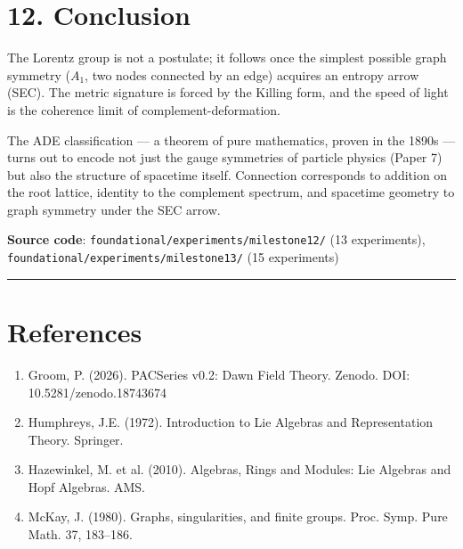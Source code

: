\documentclass[11pt,a4paper]{article}
\providecommand{\tightlist}{\setlength{\itemsep}{0pt}\setlength{\parskip}{0pt}}
\begin{document}
\section*{12. Conclusion}

The Lorentz group is not a postulate; it follows once the simplest possible graph symmetry ($A_1$, two nodes connected by an edge) acquires an entropy arrow (SEC). The metric signature is forced by the Killing form, and the speed of light is the coherence limit of complement-deformation.

The ADE classification — a theorem of pure mathematics, proven in the 1890s — turns out to encode not just the gauge symmetries of particle physics (Paper 7) but also the structure of spacetime itself. Connection corresponds to addition on the root lattice, identity to the complement spectrum, and spacetime geometry to graph symmetry under the SEC arrow.

\textbf{Source code}: \texttt{foundational/experiments/milestone12/} (13 experiments), \texttt{foundational/experiments/milestone13/} (15 experiments)

\begin{center}\rule{0.5\linewidth}{0.4pt}\end{center}

\section*{References}

\begin{enumerate}\tightlist
\item Groom, P. (2026). PACSeries v0.2: Dawn Field Theory. Zenodo. DOI: 10.5281/zenodo.18743674
\item Humphreys, J.E. (1972). Introduction to Lie Algebras and Representation Theory. Springer.
\item Hazewinkel, M. et al. (2010). Algebras, Rings and Modules: Lie Algebras and Hopf Algebras. AMS.
\item McKay, J. (1980). Graphs, singularities, and finite groups. Proc. Symp. Pure Math. 37, 183–186.
\end{enumerate}
\end{document}
